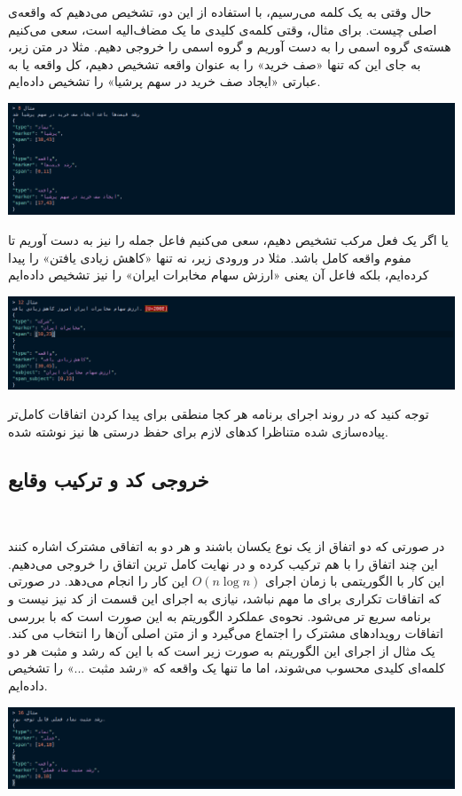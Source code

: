 \documentclass[a4paper,12pt]{article}
\begin{document}
حال وقتی به یک کلمه‌ می‌رسیم، با استفاده از این دو، تشخیص می‌دهیم که واقعه‌ی اصلی چیست. 
برای مثال، وقتی کلمه‌ی کلیدی ما یک مضاف‌الیه است، سعی می‌کنیم هسته‌ی گروه اسمی را به دست 
آوریم و گروه اسمی را خروجی دهیم. مثلا در متن زیر، به جای این که تنها «صف خرید» را 
به عنوان واقعه تشخیص دهیم، کل واقعه یا به عبارتی «ایجاد صف خرید 
در سهم پرشیا» را تشخیص داده‌ایم. 

\begin{center}
	\includegraphics[scale=0.5, trim ={0 0 17cm 0}, clip]{images/8.png}
\end{center}

یا اگر یک فعل مرکب تشخیص دهیم، سعی می‌کنیم فاعل جمله‌ را نیز به دست آوریم تا مفوم 
واقعه کامل باشد. مثلا در ورودی زیر، نه تنها «کاهش زیادی یافتن» را پیدا کرده‌ایم، بلکه 
فاعل آن یعنی «ارزش سهام مخابرات 
ایران» را نیز تشخیص داده‌ایم 
\begin{center}
	\includegraphics[scale=0.5, trim ={0 0 17cm 0}, clip]{images/12.png}
\end{center}
  توجه کنید که در روند اجرای برنامه هر کجا منطقی برای پیدا کردن اتفاقات کامل‌تر پیاده‌سازی شده متناظرا کد‌های لازم برای حفظ درستی
  ها نیز نوشته شده.

\subsection*{خروجی کد و ترکیب وقایع}
\


  در صورتی که دو اتفاق از یک نوع یکسان باشند و هر دو به اتفاقی مشترک اشاره کنند
  این چند اتفاق را با هم ترکیب کرده و در نهایت کامل ‌ترین اتفاق را خروجی می‌دهیم. 
    این کار با الگوریتمی  با زمان اجرای 
 $O(n \log n)$
این کار را انجام می‌دهد. در صورتی که اتفاقات تکراری برای ما مهم نباشد، 
نیازی به اجرای این قسمت از کد نیز نیست و برنامه سریع تر می‌شود. 
نحوه‌ی عملکرد الگوریتم به این صورت است که با بررسی 
  اتفاقات رویدادهای مشترک را اجتماع می‌گیرد و از متن اصلی آن‌ها را انتخاب می کند. یک مثال از اجرای این الگوریتم به صورت 
  زیر است که با این که رشد و مثبت هر دو کلمه‌ای کلیدی محسوب می‌شوند، اما 
  ما تنها یک واقعه که «رشد مثبت ...» را تشخیص داده‌ایم. 

\begin{center}
	\includegraphics[scale=0.5, trim ={0 0 17cm 0}, clip]{images/16.png}
\end{center}
\end{document}
